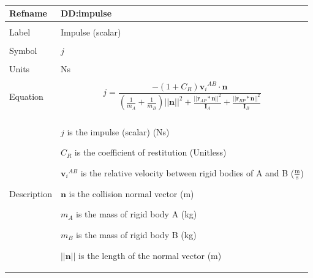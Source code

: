 \documentclass[12pt]{article}
\begin{document}
~\newline
 \noindent \begin{minipage}{\textwidth}
\begin{tabular}{p{} p{}}
\toprule \textbf{Refname} & \textbf{DD:impulse}
\label{DD:impulse}
\\ \midrule \\
Label & Impulse (scalar)
        \\ \midrule \\
        Symbol & $j$
                 \\ \midrule \\
                 Units & Ns
                         \\ \midrule \\
                         Equation & \begin{displaymath}
                                    j=\frac{-\left(1+{C_{R}}\right) {{\mathbf{v}_{i}}^{AB}}\cdot{}\mathbf{n}}{\left(\frac{1}{{m_{A}}}+\frac{1}{{m_{B}}}\right) ||\mathbf{n}||^{2}+\frac{||{\mathbf{r}_{AP}}*\mathbf{n}||^{2}}{{\mathbf{I}_{A}}}+\frac{||{\mathbf{r}_{BP}}*\mathbf{n}||^{2}}{{\mathbf{I}_{B}}}}
                                    \end{displaymath}
                                    \\ \midrule \\
                                    Description & \begin{symbDescription}
                                                  \item{$j$ is the impulse (scalar) (Ns)}
                                                  \item{${C_{R}}$ is the coefficient of restitution (Unitless)}
                                                  \item{${{\mathbf{v}_{i}}^{AB}}$ is the relative velocity between rigid bodies of A and B ($\frac{\text{m}}{\text{s}}$)}
                                                  \item{$\mathbf{n}$ is the collision normal vector (m)}
                                                  \item{${m_{A}}$ is the mass of rigid body A (kg)}
                                                  \item{${m_{B}}$ is the mass of rigid body B (kg)}
                                                  \item{$||\mathbf{n}||$ is the length of the normal vector (m)}

\end{symbDescription}
\end{tabular}
\end{minipage}
\end{document}
